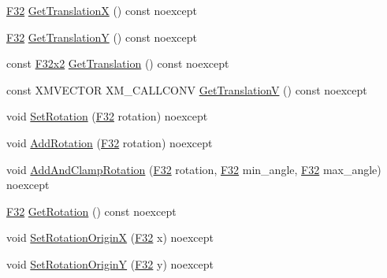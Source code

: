 \begin{DoxyCompactItemize}
\mbox{\hyperlink{namespacemage_aa97e833b45f06d60a0a9c4fc22ae02c0}{F32}} \mbox{\hyperlink{classmage_1_1_texture_transform_a94d51c47a75024fadfd849fc45e5268d}{Get\+TranslationX}} () const noexcept
\item 
\mbox{\hyperlink{namespacemage_aa97e833b45f06d60a0a9c4fc22ae02c0}{F32}} \mbox{\hyperlink{classmage_1_1_texture_transform_a55bb63ee1f43af0208074fd876ba8d74}{Get\+TranslationY}} () const noexcept
\item 
const \mbox{\hyperlink{namespacemage_aee4759dedc8def6c6dec26b5c7eddf29}{F32x2}} \mbox{\hyperlink{classmage_1_1_texture_transform_ac57e70558e24264fa178f7c7c821397f}{Get\+Translation}} () const noexcept
\item 
const X\+M\+V\+E\+C\+T\+OR X\+M\+\_\+\+C\+A\+L\+L\+C\+O\+NV \mbox{\hyperlink{classmage_1_1_texture_transform_a17417d31cbffb2c987269c1e94ad37de}{Get\+TranslationV}} () const noexcept
\item 
void \mbox{\hyperlink{classmage_1_1_texture_transform_aadf399acb4be8b747e71224a3e1f723c}{Set\+Rotation}} (\mbox{\hyperlink{namespacemage_aa97e833b45f06d60a0a9c4fc22ae02c0}{F32}} rotation) noexcept
\item 
void \mbox{\hyperlink{classmage_1_1_texture_transform_a025cf31a0005883a3b351907121a5469}{Add\+Rotation}} (\mbox{\hyperlink{namespacemage_aa97e833b45f06d60a0a9c4fc22ae02c0}{F32}} rotation) noexcept
\item 
void \mbox{\hyperlink{classmage_1_1_texture_transform_ab66d7a0aeee748829636290c6222a26a}{Add\+And\+Clamp\+Rotation}} (\mbox{\hyperlink{namespacemage_aa97e833b45f06d60a0a9c4fc22ae02c0}{F32}} rotation, \mbox{\hyperlink{namespacemage_aa97e833b45f06d60a0a9c4fc22ae02c0}{F32}} min\+\_\+angle, \mbox{\hyperlink{namespacemage_aa97e833b45f06d60a0a9c4fc22ae02c0}{F32}} max\+\_\+angle) noexcept
\item 
\mbox{\hyperlink{namespacemage_aa97e833b45f06d60a0a9c4fc22ae02c0}{F32}} \mbox{\hyperlink{classmage_1_1_texture_transform_ade561a56fa2e80b70c74620277a9afa1}{Get\+Rotation}} () const noexcept
\item 
void \mbox{\hyperlink{classmage_1_1_texture_transform_a7df3d49e14ce92fc8071f15d35018eb8}{Set\+Rotation\+OriginX}} (\mbox{\hyperlink{namespacemage_aa97e833b45f06d60a0a9c4fc22ae02c0}{F32}} x) noexcept
\item 
void \mbox{\hyperlink{classmage_1_1_texture_transform_af5808699dd47eb6672391e5725a0b7ea}{Set\+Rotation\+OriginY}} (\mbox{\hyperlink{namespacemage_aa97e833b45f06d60a0a9c4fc22ae02c0}{F32}} y) noexcept
\item 

\end{DoxyCompactItemize}
